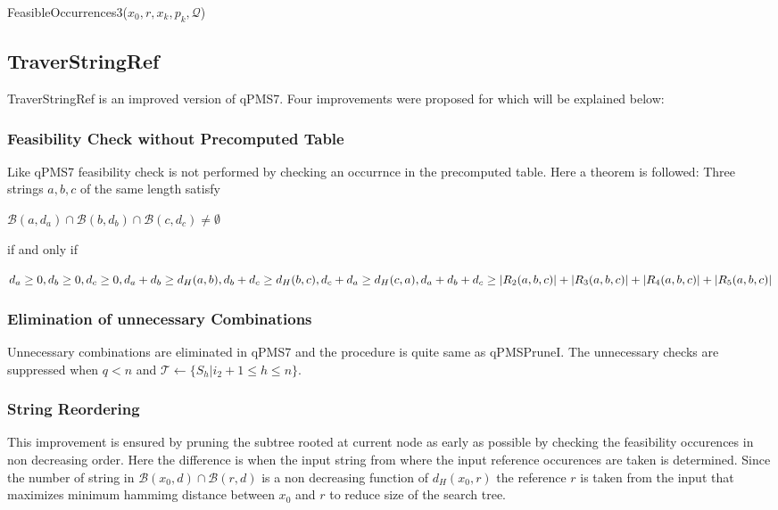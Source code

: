 {\begin{algorithm}[H]
	\caption{FeasibleOccurrences3($x_0,r,x_k,p_k,\mathcal{Q}$)}
	\label{feasibleoccurrences3}
	\begin{algorithmic}[1]
		
	\end{algorithmic}
\end{algorithm}


\subsection{TraverStringRef}
TraverStringRef is an improved version of qPMS7. Four improvements were proposed for which will be explained below: \newline
	
\subsubsection{Feasibility Check without Precomputed Table}
Like qPMS7 feasibility check is not performed by checking an occurrnce in the precomputed table. Here a theorem is followed:
Three strings $a,b,c$ of the same length satisfy
\begin{center}
	$\mathcal{B}(a,d_{a})\cap \mathcal{B}(b,d_{b})\cap \mathcal{B}(c,d_{c})\neq \emptyset$
\end{center}
if and only if 
\begin{center}
	$d_{a} \geq 0, d_{b} \geq 0, d_{c} \geq 0, \newline d_{a}+d_{b} \geq d_{H}(a,b), \newline d_{b}+d_{c} \geq d_{H}(b,c), \newline d_{c}+d_{a} \geq d_{H}(c,a), \newline d_{a}+d_{b}+d_{c} \geq |R_{2}(a,b,c)|+ |R_{3}(a,b,c)|+ |R_{4}(a,b,c)|+ |R_{5}(a,b,c)|$
	
\end{center}	


\subsubsection{Elimination of unnecessary Combinations}
Unnecessary combinations are eliminated in qPMS7 and the procedure is quite same as qPMSPruneI. The unnecessary checks are suppressed when $q<n$ and $\mathcal{T} \leftarrow \{S_{h}|i_{2}+1 \leq h \leq n\}$.

\subsubsection{String Reordering}
This improvement is ensured by pruning the subtree rooted at current node as early as possible by checking the feasibility occurences in non decreasing order. Here the difference is when the input string from where the input reference occurences are taken is determined. Since the number of string in $\mathcal{B}(x_{0},d) \cap \mathcal{B}(r,d)$ is a non decreasing function of $d_{H}(x_{0},r)$ the reference $r$ is taken from the input that maximizes minimum hammimg distance between $x_{0}$ and $r$ to reduce size of the search tree.

}
